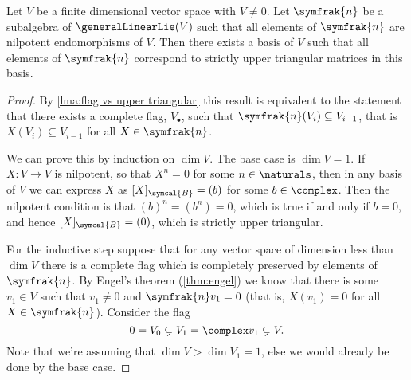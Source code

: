 \documentclass[fleqn]{NotesClass}
\newcommand{\nilpotentLie}{\symfrak{n}}
\begin{document}
    \begin{crl}{}{}
        Let \(V\) be a finite dimensional vector space with \(V \ne 0\).
        Let \(\nilpotentLie\) be a subalgebra of \(\generalLinearLie(V)\) such that all elements of \(\nilpotentLie\) are nilpotent endomorphisms of \(V\).
        Then there exists a basis of \(V\) such that all elements of \(\nilpotentLie\) correspond to strictly upper triangular matrices in this basis.
        \begin{proof}
            By \cref{lma:flag vs upper triangular} this result is equivalent to the statement that there exists a complete flag, \(V_{\bullet}\), such that \(\nilpotentLie(V_i) \subseteq V_{i-1}\), that is \(X(V_i) \subseteq V_{i - 1}\) for all \(X \in \nilpotentLie\).
            
            We can prove this by induction on \(\dim V\).
            The base case is \(\dim V = 1\).
            If \(X \colon V \to V\) is nilpotent, so that \(X^n = 0\) for some \(n \in \naturals\), then in any basis of \(V\) we can express \(X\) as \([X]_{\symcal{B}} = (b)\) for some \(b \in \complex\).
            Then the nilpotent condition is that \((b)^n = (b^n) = 0\), which is true if and only if \(b = 0\), and hence \([X]_{\symcal{B}} = (0)\), which is strictly upper triangular.
            
            For the inductive step suppose that for any vector space of dimension less than \(\dim V\) there is a complete flag which is completely preserved by elements of \(\nilpotentLie\).
            By Engel's theorem (\cref{thm:engel}) we know that there is some \(v_1 \in V\) such that \(v_1 \ne 0\) and \(\nilpotentLie v_1 = 0\) (that is, \(X(v_1) = 0\) for all \(X \in \nilpotentLie\)).
            Consider the flag
            \begin{equation}
                0 = V_0 \subsetneq V_1 = \complex v_1 \subsetneq V.
            \end{equation}
            Note that we're assuming that \(\dim V > \dim V_1 = 1\), else we would already be done by the base case.
            

\end{proof}
\end{crl}
\end{document}
